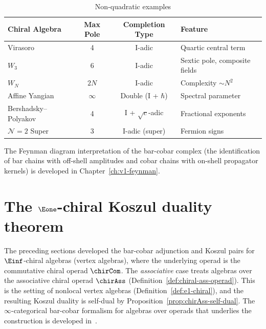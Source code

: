 
\begin{table}[ht]
\centering
\caption{Non-quadratic examples}
\begin{tabular}{|l|c|c|l|}
\hline
\textbf{Chiral Algebra} & \textbf{Max Pole} & \textbf{Completion Type} & \textbf{Feature} \\
\hline
Virasoro & 4 & I-adic & Quartic central term \\
$W_3$ & 6 & I-adic & Sextic pole, composite fields \\
$W_N$ & $2N$ & I-adic & Complexity $\sim N^2$ \\
Affine Yangian & $\infty$ & Double (I + $\hbar$) & Spectral parameter \\
Bershadsky--Polyakov & 4 & I + $\sqrt{c}$-adic & Fractional exponents \\
$\mathcal{N}=2$ Super & 3 & I-adic (super) & Fermion signs \\
\hline
\end{tabular}
\end{table}

\begin{remark}\label{sec:feynman_genus_g}
The Feynman diagram interpretation of the bar-cobar complex (the
identification of bar chains with off-shell amplitudes and cobar chains
with on-shell propagator kernels) is developed in
Chapter~\ref{ch:v1-feynman}.
\end{remark}

\section{\texorpdfstring{The $\Eone$-chiral Koszul duality theorem}{The E1-chiral Koszul duality theorem}}

The preceding sections developed the bar-cobar adjunction and Koszul
pairs for $\Einf$-chiral algebras (vertex algebras), where the
underlying operad is the commutative chiral operad $\chirCom$.
The \emph{associative} case treats algebras over the
associative chiral operad $\chirAss$
(Definition~\ref{def:chiral-ass-operad}). This is the
setting of nonlocal vertex algebras
(Definition~\ref{def:e1-chiral}), and the resulting Koszul duality
is self-dual by Proposition~\ref{prop:chirAss-self-dual}.
The $\infty$-categorical bar-cobar formalism for algebras over operads
that underlies the construction is developed in~\cite[§3.1]{HA}.

